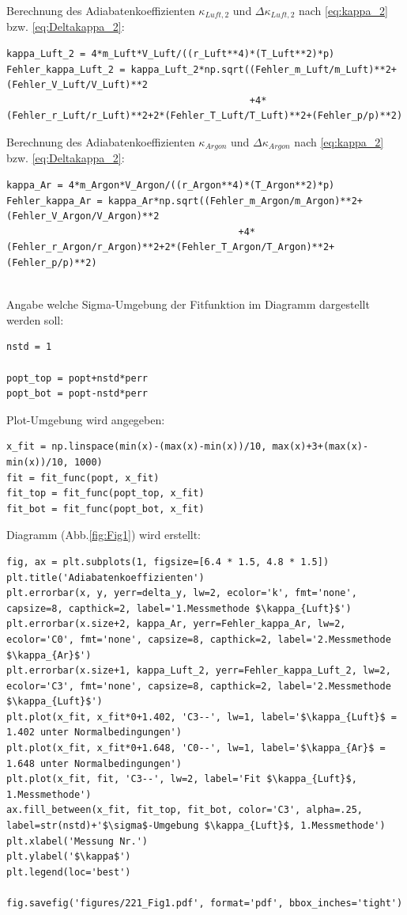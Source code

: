 \documentclass[a4paper,10pt]{article}
\begin{document}
Berechnung des Adiabatenkoeffizienten \(\kappa_{Luft, 2}\) und \(\Delta \kappa_{Luft,2}\) nach \eqref{eq:kappa_2} bzw. \eqref{eq:Deltakappa_2}:\begin{lstlisting}
kappa_Luft_2 = 4*m_Luft*V_Luft/((r_Luft**4)*(T_Luft**2)*p)
Fehler_kappa_Luft_2 = kappa_Luft_2*np.sqrt((Fehler_m_Luft/m_Luft)**2+(Fehler_V_Luft/V_Luft)**2
                                           +4*(Fehler_r_Luft/r_Luft)**2+2*(Fehler_T_Luft/T_Luft)**2+(Fehler_p/p)**2)

\end{lstlisting}

Berechnung des Adiabatenkoeffizienten \(\kappa_{Argon}\) und \(\Delta \kappa_{Argon}\) nach \eqref{eq:kappa_2} bzw. \eqref{eq:Deltakappa_2}:\begin{lstlisting}
kappa_Ar = 4*m_Argon*V_Argon/((r_Argon**4)*(T_Argon**2)*p)
Fehler_kappa_Ar = kappa_Ar*np.sqrt((Fehler_m_Argon/m_Argon)**2+(Fehler_V_Argon/V_Argon)**2
                                         +4*(Fehler_r_Argon/r_Argon)**2+2*(Fehler_T_Argon/T_Argon)**2+(Fehler_p/p)**2)


\end{lstlisting}

Angabe welche Sigma-Umgebung der Fitfunktion im Diagramm dargestellt werden soll:\begin{lstlisting}
nstd = 1

popt_top = popt+nstd*perr
popt_bot = popt-nstd*perr

\end{lstlisting}

Plot-Umgebung wird angegeben:\begin{lstlisting}
x_fit = np.linspace(min(x)-(max(x)-min(x))/10, max(x)+3+(max(x)-min(x))/10, 1000)
fit = fit_func(popt, x_fit)
fit_top = fit_func(popt_top, x_fit)
fit_bot = fit_func(popt_bot, x_fit)

\end{lstlisting}

Diagramm (Abb.\ref{fig:Fig1}) wird erstellt:\begin{lstlisting}
fig, ax = plt.subplots(1, figsize=[6.4 * 1.5, 4.8 * 1.5])
plt.title('Adiabatenkoeffizienten')
plt.errorbar(x, y, yerr=delta_y, lw=2, ecolor='k', fmt='none', capsize=8, capthick=2, label='1.Messmethode $\kappa_{Luft}$')
plt.errorbar(x.size+2, kappa_Ar, yerr=Fehler_kappa_Ar, lw=2, ecolor='C0', fmt='none', capsize=8, capthick=2, label='2.Messmethode $\kappa_{Ar}$')
plt.errorbar(x.size+1, kappa_Luft_2, yerr=Fehler_kappa_Luft_2, lw=2, ecolor='C3', fmt='none', capsize=8, capthick=2, label='2.Messmethode $\kappa_{Luft}$')
plt.plot(x_fit, x_fit*0+1.402, 'C3--', lw=1, label='$\kappa_{Luft}$ = 1.402 unter Normalbedingungen')
plt.plot(x_fit, x_fit*0+1.648, 'C0--', lw=1, label='$\kappa_{Ar}$ = 1.648 unter Normalbedingungen')
plt.plot(x_fit, fit, 'C3--', lw=2, label='Fit $\kappa_{Luft}$, 1.Messmethode')
ax.fill_between(x_fit, fit_top, fit_bot, color='C3', alpha=.25, label=str(nstd)+'$\sigma$-Umgebung $\kappa_{Luft}$, 1.Messmethode')
plt.xlabel('Messung Nr.')
plt.ylabel('$\kappa$')
plt.legend(loc='best')

fig.savefig('figures/221_Fig1.pdf', format='pdf', bbox_inches='tight')

\end{lstlisting}
\end{document}
